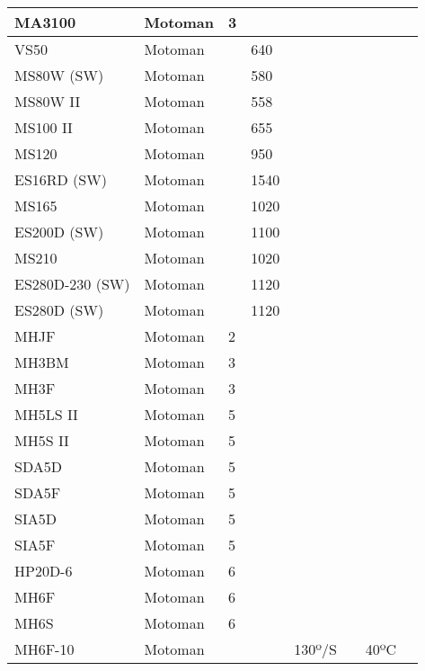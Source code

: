 \begin{longtable}{|p{}|p{}|p{}|p{}|p{}|p{}|p{}|p{}|}
MA3100 & Motoman & \cellcolor{red} 3 &  &  &  &  &  \\ \hline
VS50 & Motoman &  & \cellcolor{red} 640 &  &  &  &  \\ \hline
MS80W (SW) & Motoman &  & \cellcolor{red} 580 &  &  &  &  \\ \hline
MS80W II & Motoman &  & \cellcolor{red} 558 &  &  &  &  \\ \hline
MS100 II & Motoman &  & \cellcolor{red} 655 &  &  &  &  \\ \hline
MS120 & Motoman &  & \cellcolor{red} 950 &  &  &  &  \\ \hline
ES16RD (SW) & Motoman &  & \cellcolor{red} 1540 &  &  &  &  \\ \hline
MS165 & Motoman &  & \cellcolor{red} 1020 &  &  &  &  \\ \hline
ES200D (SW) & Motoman &  & \cellcolor{red} 1100 &  &  &  &  \\ \hline
MS210 & Motoman &  & \cellcolor{red} 1020 &  &  &  &  \\ \hline
ES280D-230 (SW) & Motoman &  & \cellcolor{red} 1120 &  &  &  &  \\ \hline
ES280D (SW) & Motoman &  & \cellcolor{red} 1120 &  &  &  &  \\ \hline
MHJF & Motoman & \cellcolor{red} 2 &  &  &  &  &  \\ \hline
MH3BM & Motoman & \cellcolor{red} 3 &  &  &  &  &  \\ \hline
MH3F & Motoman & \cellcolor{red} 3 &  &  &  &  &  \\ \hline
MH5LS II & Motoman & \cellcolor{red} 5 &  &  &  &  &  \\ \hline
MH5S II & Motoman & \cellcolor{red} 5 &  &  &  &  &  \\ \hline
SDA5D & Motoman & \cellcolor{red} 5 &  &  &  &  &  \\ \hline
SDA5F & Motoman & \cellcolor{red} 5 &  &  &  &  &  \\ \hline
SIA5D & Motoman & \cellcolor{red} 5 &  &  &  &  &  \\ \hline
SIA5F & Motoman & \cellcolor{red} 5 &  &  &  &  &  \\ \hline
HP20D-6 & Motoman & \cellcolor{red} 6 &  &  &  &  &  \\ \hline
MH6F & Motoman & \cellcolor{red} 6 &  &  &  &  &  \\ \hline
MH6S & Motoman & \cellcolor{red} 6 &  &  &  &  &  \\ \hline
\cellcolor{green} MH6F-10 & Motoman &  &  & 130º/S &  & 40ºC &  \\ \hline

\end{longtable}
